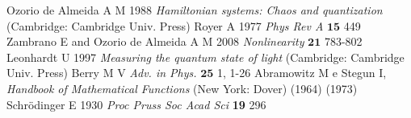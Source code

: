 \documentclass[12pt]{iopart}
\begin{document}
\begin{thebibliography}{99}
 Ozorio de Almeida A M 1988
            \emph{Hamiltonian systems: Chaos and quantization} (Cambridge: Cambridge Univ. Press)
 Royer A 1977 \emph{Phys Rev A} $\bm{15}$ 449
 Zambrano E and Ozorio de Almeida A M  2008
        \emph{Nonlinearity} $\bm{21}$ 783-802 
 Leonhardt U 1997
        \emph{Measuring the quantum state of light} (Cambridge: Cambridge Univ. Press)
 Berry M V
        \emph{Adv. in Phys.} $\bm{25}$ 1, 1-26
 Abramowitz M e Stegun I,
        \emph{Handbook of Mathematical Functions} (New York: Dover)
        (1964)
        (1973)
 Schr\"odinger E 1930 
        \emph{Proc Pruss Soc Acad Sci} {\bf 19} 296
\end{thebibliography}
\end{document}
